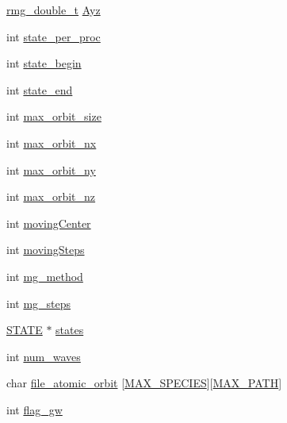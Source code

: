 \begin{DoxyCompactItemize}
\item 
\hyperlink{rmgtypes_8h_aaa16921c14f121c56eaa42390a340db8}{rmg\-\_\-double\-\_\-t} \hyperlink{struct_c_o_n_t_r_o_l_ac48847691a57efaafdb5bef90d2abe9e}{Ayz}
\item 
int \hyperlink{struct_c_o_n_t_r_o_l_af17efa41c51d9b5b8aa1f3e616a4d696}{state\-\_\-per\-\_\-proc}
\item 
int \hyperlink{struct_c_o_n_t_r_o_l_aadaaeb1f5694dabddd9413fba092c782}{state\-\_\-begin}
\item 
int \hyperlink{struct_c_o_n_t_r_o_l_a3fd2627c346b23abb62460886d17b7b0}{state\-\_\-end}
\item 
int \hyperlink{struct_c_o_n_t_r_o_l_ac99fe3e836d25c6cd4f9c80fe00c8fd6}{max\-\_\-orbit\-\_\-size}
\item 
int \hyperlink{struct_c_o_n_t_r_o_l_aa57e07bdfa03ca076cfd955b592ccc54}{max\-\_\-orbit\-\_\-nx}
\item 
int \hyperlink{struct_c_o_n_t_r_o_l_aadc9fa66cc863534c076ff1ddad8f032}{max\-\_\-orbit\-\_\-ny}
\item 
int \hyperlink{struct_c_o_n_t_r_o_l_a04d887e3a36946ac5577d4b4541fb801}{max\-\_\-orbit\-\_\-nz}
\item 
int \hyperlink{struct_c_o_n_t_r_o_l_a3d603f4cf688980a7a4eb7e634a2c44c}{moving\-Center}
\item 
int \hyperlink{struct_c_o_n_t_r_o_l_a71d9f51f93169484075d3632a1b0b15d}{moving\-Steps}
\item 
int \hyperlink{struct_c_o_n_t_r_o_l_aa6857707b31e9e81f7590247a04e2a11}{mg\-\_\-method}
\item 
int \hyperlink{struct_c_o_n_t_r_o_l_ac3102fc0f97b0a6e72c70f7742a7f134}{mg\-\_\-steps}
\item 
\hyperlink{struct_s_t_a_t_e}{S\-T\-A\-T\-E} $\ast$ \hyperlink{struct_c_o_n_t_r_o_l_a29584ab5885b7a497dd0982bcd02e621}{states}
\item 
int \hyperlink{struct_c_o_n_t_r_o_l_a4692267b88ba2498a0a5d434504096b2}{num\-\_\-waves}
\item 
char \hyperlink{struct_c_o_n_t_r_o_l_a03079e43a5b1f17e9ff98f4bf8d81d59}{file\-\_\-atomic\-\_\-orbit} \mbox{[}\hyperlink{_t_d_d_f_t_2_headers_2params_8h_a9a9ccddfec36bf0f49a168a9dcb8f87e}{M\-A\-X\-\_\-\-S\-P\-E\-C\-I\-E\-S}\mbox{]}\mbox{[}\hyperlink{_t_d_d_f_t_2_headers_2params_8h_ab99ded389af74001a6298fc9e44e74e5}{M\-A\-X\-\_\-\-P\-A\-T\-H}\mbox{]}
\item 
int \hyperlink{struct_c_o_n_t_r_o_l_acfef06d1d27ea1f6c5af04030a271439}{flag\-\_\-gw}
\item 

\end{DoxyCompactItemize}
